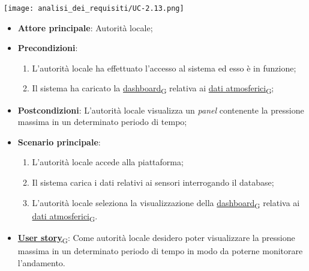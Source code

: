\begin{center}
	\texttt{[image: analisi\_dei\_requisiti/UC-2.13.png]}
\end{center}
\begin{itemize}
	\item \textbf{Attore principale}: Autorità locale;
	\item \textbf{Precondizioni}:
	      \begin{enumerate}
		      \item L'autorità locale ha effettuato l'accesso al sistema ed esso è in funzione;
		      \item Il sistema ha caricato la \href{https://7last.github.io/docs/rtb/documentazione-interna/glossario\#dashboard}{dashboard\textsubscript{G}} relativa ai \href{https://7last.github.io/docs/rtb/documentazione-interna/glossario\#dati-atmosferici}{dati atmosferici\textsubscript{G}};
	      \end{enumerate}
	\item \textbf{Postcondizioni}: L'autorità locale visualizza un \textit{panel} contenente la pressione massima in un determinato periodo di tempo;
	\item \textbf{Scenario principale}:
	      \begin{enumerate}
		      \item L'autorità locale accede alla piattaforma;
		      \item Il sistema carica i dati relativi ai sensori interrogando il database;
		      \item L'autorità locale seleziona la visualizzazione della \href{https://7last.github.io/docs/rtb/documentazione-interna/glossario\#dashboard}{dashboard\textsubscript{G}} relativa ai \href{https://7last.github.io/docs/rtb/documentazione-interna/glossario\#dati-atmosferici}{dati atmosferici\textsubscript{G}}.
	      \end{enumerate}
	\item \href{https://7last.github.io/docs/rtb/documentazione-interna/glossario\#user-story}{\textbf{User story}\textsubscript{G}}: Come autorità locale desidero poter visualizzare la pressione massima in un determinato periodo di tempo
	      in modo da poterne monitorare l'andamento.
\end{itemize}

